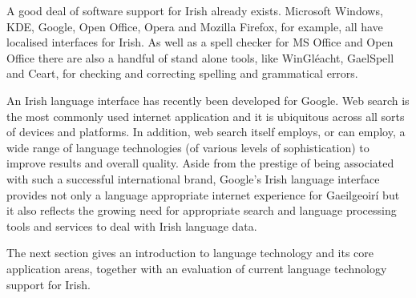\begin{multicols}{2}
A good deal of software support for Irish already exists. Microsoft Windows, KDE, Google, Open Office, Opera and Mozilla Firefox, for example, all have localised interfaces for Irish. As well as a spell checker for MS Office and Open Office there are also a handful of stand alone tools, like WinGléacht, GaelSpell and Ceart, for checking and correcting spelling and grammatical errors. 



An Irish language interface has recently been developed for Google. Web search is the most commonly used internet application and it is ubiquitous across all sorts of devices and platforms. In addition, web search itself employs, or can employ, a wide range of language technologies (of various levels of sophistication) to improve results and overall quality. Aside from the prestige of being associated with such a successful international brand, Google’s Irish language interface provides not only a language appropriate internet experience for Gaeilgeoirí but it also reflects the growing need for appropriate search and language processing tools and services to deal with Irish language data.

The next section gives an introduction to language technology and its core application areas, together with an evaluation of current language technology support for Irish.


\end{multicols}
\clearpage

